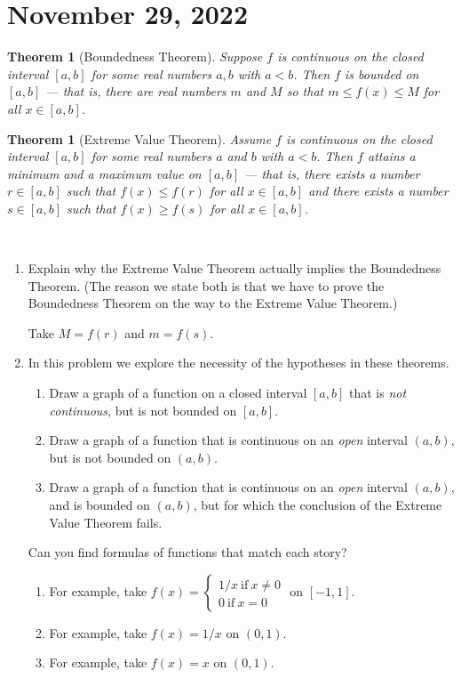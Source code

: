 \documentclass[12pt]{amsart}
\numberwithin{equation}{section}
\theoremstyle{plain} %
\newtheorem{thm}[equation]{Theorem}
\newcommand{\Nov}[1]{\section{November #1, 2022}}
\theoremstyle{definition}
\theoremstyle{remark}
\begin{document}
\Nov{29}

	
\begin{thm}[Boundedness Theorem] Suppose $f$ is continuous on the closed interval $[a,b]$ for some real numbers $a,b$ with $a < b$. Then $f$ is bounded on $[a,b]$ --- that is,
  there are real numbers $m$ and $M$ so that $m \leq f(x) \leq M$ for all $x \in [a,b]$.
  \end{thm}
  
  
  
\begin{thm}[Extreme Value Theorem] Assume $f$ is continuous on the closed interval $[a,b]$ for some real numbers $a$ and $b$ with $a < b$.
  Then $f$ attains a minimum and a maximum value on $[a,b]$ ---
that is, there exists a number $r \in [a,b]$ such that $f(x) \leq f(r)$ for all $x \in [a,b]$ and
there exists a number $s \in [a,b]$ such that $f(x) \geq f(s)$ for all $x \in [a,b]$.
\end{thm}




\

\begin{enumerate}
\item Explain why the Extreme Value Theorem actually implies the Boundedness Theorem. (The reason we state both is that we have to prove the Boundedness Theorem on the way to the Extreme Value Theorem.)

\begin{framed}
Take $M=f(r)$ and $m=f(s)$.
\end{framed}

\item In this problem we explore the necessity of the hypotheses in these theorems.
\begin{enumerate}
\item Draw a graph of a function on a closed interval $[a,b]$ that is \emph{not continuous}, but is not bounded on $[a,b]$.
\item Draw a graph of a function that is continuous on an \emph{open} interval $(a,b)$, but is not bounded on $(a,b)$.
\item Draw a graph of a function that is continuous on an \emph{open} interval $(a,b)$, and is bounded on $(a,b)$, but for which the conclusion of the Extreme Value Theorem fails.
\end{enumerate}
Can you find formulas of functions that match each story?

\begin{framed}
\begin{enumerate}
\item For example, take $f(x)=\begin{cases} 1/x \ \text{if} \ x\neq 0 \\ 0  \ \text{if} \ x= 0\end{cases}$ on $[-1,1]$.
\item For example, take $f(x)=1/x$ on $(0,1)$.
\item For example, take $f(x)=x$ on $(0,1)$.
\end{enumerate}
\end{framed}
   \end{enumerate}
\end{document}
